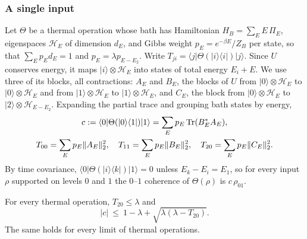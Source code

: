 \subsubsection{A single input}

Let $\Theta$ be a thermal operation whose bath has Hamiltonian $H_B=\sum_EE\,\Pi_E$, eigenspaces $\mathcal H_E$ of dimension $d_E$, and Gibbs weight $p_E=e^{-\beta E}/Z_B$ per state, so that $\sum_Ep_Ed_E=1$ and $p_E=\lambda p_{E-E_2}$. Write $T_{ji}=\langle j|\Theta(|i\rangle\langle i|)|j\rangle$. Since $U$ conserves energy, it maps $|i\rangle\otimes\mathcal H_E$ into states of total energy $E_i+E$. We use three of its blocks, all contractions: $A_E$ and $B_E$, the blocks of $U$ from $|0\rangle\otimes\mathcal H_E$ to $|0\rangle\otimes\mathcal H_E$ and from $|1\rangle\otimes\mathcal H_E$ to $|1\rangle\otimes\mathcal H_E$, and $C_E$, the block from $|0\rangle\otimes\mathcal H_E$ to $|2\rangle\otimes\mathcal H_{E-E_2}$. Expanding the partial trace and grouping bath states by energy,
\begin{equation}\label{sw:eq:modes}
\begin{gathered}
c:=\langle0|\Theta(|0\rangle\langle1|)|1\rangle=\sum_Ep_E\operatorname{Tr}(B_E^*A_E),\\
T_{00}=\sum_Ep_E\|A_E\|_2^2,\quad T_{11}=\sum_Ep_E\|B_E\|_2^2,\quad T_{20}=\sum_Ep_E\|C_E\|_2^2.
\end{gathered}
\end{equation}
By time covariance, $\langle0|\Theta(|i\rangle\langle k|)|1\rangle=0$ unless $E_k-E_i=E_1$, so for every input $\rho$ supported on levels $0$ and $1$ the $0$--$1$ coherence of $\Theta(\rho)$ is $c\,\rho_{01}$.

\begin{lemma}\label{sw:lem:coherence}
For every thermal operation, $T_{20}\le\lambda$ and
\[
|c|\ \le\ 1-\lambda+\sqrt{\lambda(\lambda-T_{20})}.
\]
The same holds for every limit of thermal operations.
\end{lemma}

